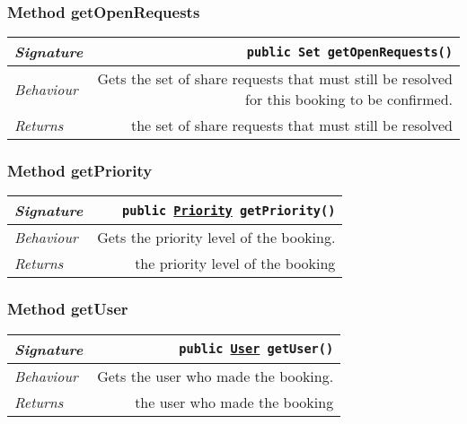 \begin{adjustwidth}{1.5em}{0pt}
\begin{adjustwidth}{1.5em}{0pt}
\begin{adjustwidth}{1.5em}{0pt}
{\begin{tabularx}{1.0\linewidth}{@{}l R@{}}
      \end{tabularx}}
    \end{adjustwidth}\subsubsection{Method getOpenRequests\label{edu.kit.hci.soli.domain.Booking@getOpenRequests()}}
    \begin{adjustwidth}{1.5em}{0pt}
      {\begin{tabularx}{1.0\linewidth}{@{}l R@{}}
        \emph{Signature} & \texttt{public \texttt{Set} getOpenRequests()} \\
        \hline
        \emph{Behaviour} & Gets the set of share requests that must still be resolved for this booking to be confirmed.    \\
        \hline
        \emph{Returns} & the set of share requests that must still be resolved  \\
        \hline
  
      \end{tabularx}}
    \end{adjustwidth}\subsubsection{Method getPriority\label{edu.kit.hci.soli.domain.Booking@getPriority()}}
    \begin{adjustwidth}{1.5em}{0pt}
      {\begin{tabularx}{1.0\linewidth}{@{}l R@{}}
        \emph{Signature} & \texttt{public \texttt{\hyperref[edu.kit.hci.soli.domain.Priority]{\texttt{Priority}}} getPriority()} \\
        \hline
        \emph{Behaviour} & Gets the priority level of the booking.    \\
        \hline
        \emph{Returns} & the priority level of the booking  \\
        \hline
  
      \end{tabularx}}
    \end{adjustwidth}\subsubsection{Method getUser\label{edu.kit.hci.soli.domain.Booking@getUser()}}
    \begin{adjustwidth}{1.5em}{0pt}
      {\begin{tabularx}{1.0\linewidth}{@{}l R@{}}
        \emph{Signature} & \texttt{public \texttt{\hyperref[edu.kit.hci.soli.domain.User]{\texttt{User}}} getUser()} \\
        \hline
        \emph{Behaviour} & Gets the user who made the booking.    \\
        \hline
        \emph{Returns} & the user who made the booking  \\
        \hline
  

\end{tabularx}}
\end{adjustwidth}
\end{adjustwidth}
\end{adjustwidth}
